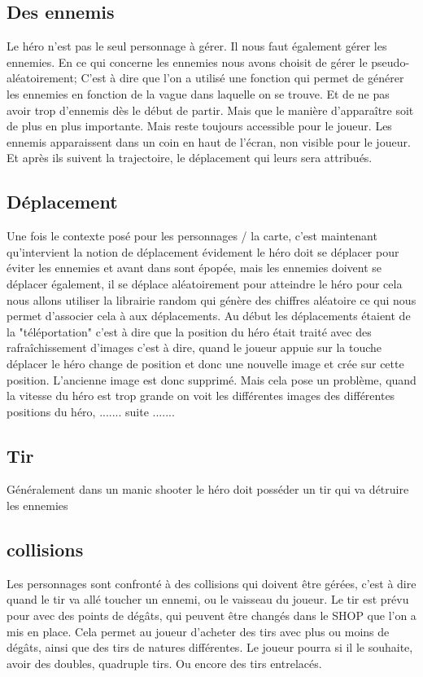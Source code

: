 \documentclass[a4paper, 11pt]{article}
\begin{document}
	\subsection{Des ennemis}
Le héro n'est pas le seul personnage à gérer. Il nous faut également gérer les ennemies. En ce qui concerne les ennemies nous avons choisit de gérer le pseudo-aléatoirement; C'est à dire que l'on a utilisé une fonction qui permet de générer les ennemies en fonction de la vague dans laquelle on se trouve. Et de ne pas avoir trop d'ennemis dès le début de partir. Mais que le manière d'apparaître soit de plus en plus importante. Mais reste toujours accessible pour le joueur. Les ennemis apparaissent dans un coin en haut de l'écran, non visible pour le joueur. Et après ils suivent la trajectoire, le déplacement qui leurs sera attribués.

	\subsection{Déplacement}
Une fois le contexte posé pour les personnages / la carte, c'est maintenant qu'intervient la notion de déplacement évidement le héro doit se déplacer pour éviter les ennemies et avant dans sont épopée, mais les ennemies doivent se déplacer également, il se déplace aléatoirement pour atteindre le héro pour cela nous allons utiliser la librairie random qui génère des chiffres aléatoire ce qui nous permet d'associer cela à aux déplacements.
Au début les déplacements étaient de la "téléportation" c'est à dire que la position du héro était traité avec des rafraîchissement d'images c'est à dire, quand le joueur appuie sur la touche déplacer le héro change de position et donc une nouvelle image et crée sur cette position. L'ancienne image est donc supprimé. Mais cela pose un problème, quand la vitesse du héro est trop grande on voit les différentes images des différentes positions du héro, ....... suite .......
	
	\subsection{Tir}
Généralement dans un manic shooter le héro doit posséder un tir qui va détruire les ennemies 
	\subsection{collisions}
Les personnages sont confronté à des collisions qui doivent être gérées, c'est à dire quand le tir va allé toucher un ennemi, ou le vaisseau du joueur. Le tir est prévu pour avec des points de dégâts, qui peuvent être changés dans le SHOP que l'on a mis en place. Cela permet au joueur d'acheter des tirs avec plus ou moins de dégâts, ainsi que des tirs de natures différentes. Le joueur pourra si il le souhaite, avoir des doubles, quadruple tirs. Ou encore des tirs entrelacés. 
\end{document}
